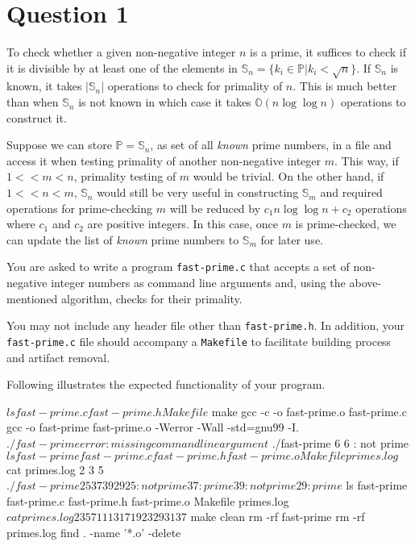 
\section*{Question 1}

To check whether a given non-negative integer $n$ is a prime, it suffices to check if it is divisible by at least one of the elements in $\mathbb{S}_n =  \{ k_i \in \mathbb{P} | k_i < \sqrt{n} \}$.
If $\mathbb{S}_n$ is known, it takes $|\mathbb{S}_n|$ operations to check for primality of $n$.
This is much better than when $\mathbb{S}_n$ is not known in which case it takes $\mathbb{O}(n \log \log n)$ operations to construct it.

Suppose we can store $\mathbb{P} = \mathbb{S}_n$, as set of all \textit{known} prime numbers, in a file and access it when testing primality of another non-negative integer $m$.
This way, if $1 << m < n$, primality testing of $m$ would be trivial.
On the other hand, if $1 << n < m$, $\mathbb{S}_n$ would still be very useful in constructing $\mathbb{S}_m$ and required operations for prime-checking $m$ will be reduced by $c_1 n \log \log n + c_2$ operations where $c_1$ and $c_2$ are positive integers.
In this case, once $m$ is prime-checked, we can update the list of \textit{known} prime numbers to $\mathbb{S}_m$ for later use.

You are asked to write a program \texttt{fast-prime.c} that accepts a set of non-negative integer numbers as command line arguments and, using the above-mentioned algorithm, checks for their primality.

You may not include any header file other than \texttt{fast-prime.h}.
In addition, your \texttt{fast-prime.c} file should accompany a \texttt{Makefile} to facilitate building process and artifact removal.

Following illustrates the expected functionality of your program.

\newpage

\begin{terminal}
$ ls
fast-prime.c fast-prime.h Makefile
$ make
gcc -c -o fast-prime.o fast-prime.c
gcc -o fast-prime fast-prime.o -Werror -Wall -std=gnu99 -I.
$ ./fast-prime
error: missing command line argument
$ ./fast-prime 6
6     : not prime
$ ls
fast-prime fast-prime.c fast-prime.h fast-prime.o
Makefile primes.log
$ cat primes.log
2
3
5
$ ./fast-prime 25 37 39 29
25    : not prime
37    : prime
39    : not prime
29    : prime
$ ls
fast-prime fast-prime.c fast-prime.h fast-prime.o Makefile primes.log
$ cat primes.log
2
3
5
7
11
13
17
19
23
29
31
37
$ make clean
rm -rf fast-prime
rm -rf primes.log
find . -name '*.o' -delete
\end{terminal}
